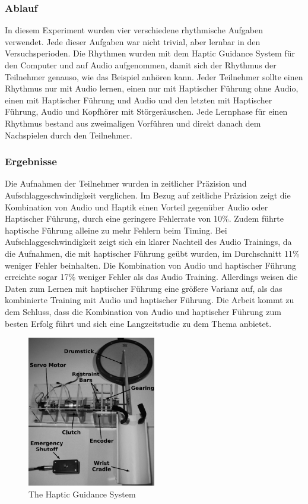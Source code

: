 \documentclass[ngerman,runningheads,a4paper]{llncs}
\begin{document}
\subsubsection{Ablauf}
In diesem Experiment wurden vier verschiedene rhythmische Aufgaben verwendet. Jede dieser Aufgaben war nicht trivial, aber lernbar in den Versuchsperioden.
Die Rhythmen wurden mit dem Haptic Guidance System für den Computer und auf Audio aufgenommen, damit sich der Rhythmus der Teilnehmer genauso, wie das Beispiel anhören kann.
Jeder Teilnehmer sollte einen Rhythmus nur mit Audio lernen, einen nur mit Haptischer Führung ohne Audio, einen mit Haptischer Führung und Audio und den letzten mit Haptischer Führung, Audio und Kopfhörer mit Störgeräuschen.
Jede Lernphase für einen Rhythmus bestand aus zweimaligen Vorführen und direkt danach dem Nachspielen durch den Teilnehmer.


\subsubsection{Ergebnisse}
Die Aufnahmen der Teilnehmer wurden in zeitlicher Präzision und Aufschlaggeschwindigkeit verglichen.
Im Bezug auf zeitliche Präzision zeigt die Kombination von Audio und Haptik einen Vorteil gegenüber Audio oder Haptischer Führung, durch eine geringere Fehlerrate von 10\%.
Zudem führte haptische Führung alleine zu mehr Fehlern beim Timing.
Bei Aufschlaggeschwindigkeit zeigt sich ein klarer Nachteil des Audio Trainings, da die Aufnahmen, die mit haptischer Führung geübt wurden, im Durchschnitt 11\%  weniger Fehler beinhalten.
Die Kombination von Audio und haptischer Führung erreichte sogar 17\% weniger Fehler als das Audio Training.
Allerdings weisen die Daten zum Lernen mit haptischer Führung eine größere Varianz auf, als das kombinierte Training mit Audio und haptischer Führung.
Die Arbeit kommt zu dem Schluss, dass die Kombination von Audio und haptischer Führung zum besten Erfolg führt und sich eine Langzeitstudie zu dem Thema anbietet.

\begin{figure}[H]
  \centering
  \includegraphics[width = 0.5\textwidth]{pictures/hapticdrumstick1}
  \caption{The Haptic Guidance System \cite{4479984}}
  \label{hagus}
\end{figure}
\end{document}
